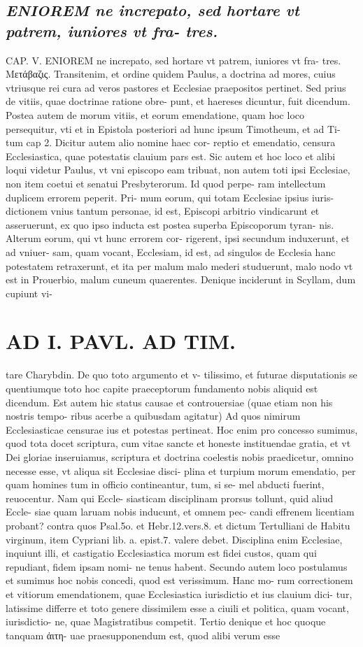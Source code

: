 \documentclass{article}
\begin{document}
\begin{pages}
\subsection*{\textit{ENIOREM ne increpato, sed hortare vt patrem, iuniores vt fra- tres.}}CAP. V. ENIOREM ne increpato, sed hortare vt patrem, iuniores vt fra- tres. Μετάβαζις. Transitenim, et ordine quidem Paulus, a doctrina ad mores, cuius vtriusque rei cura ad veros pastores et Ecclesiae praepositos pertinet. Sed prius de vitiis, quae doctrinae ratione obre- punt, et haereses dicuntur, fuit dicendum. Postea autem de morum vitiis, et eorum emendatione, quam hoc loco persequitur, vti et in Epistola posteriori ad hunc ipsum Timotheum, et ad Ti- tum cap 2. Dicitur autem alio nomine haec cor- reptio et emendatio, censura Ecclesiastica, quae potestatis clauium pars est. Sic autem et hoc loco et alibi loqui videtur Paulus, vt vni episcopo eam tribuat, non autem toti ipsi Ecclesiae, non item coetui et senatui Presbyterorum. Id quod perpe- ram intellectum duplicem errorem peperit. Pri- mum eorum, qui totam Ecclesiae ipsius iuris- dictionem vnius tantum personae, id est, Episcopi arbitrio vindicarunt et asseruerunt, ex quo ipso inducta est postea superba Episcoporum tyran- nis. Alterum eorum, qui vt hunc errorem cor- rigerent, ipsi secundum induxerunt, et ad vniuer- sam, quam vocant, Ecclesiam, id est, ad singulos de Ecclesia hanc potestatem retraxerunt, et ita per malum malo mederi studuerunt, malo nodo vt est in Prouerbio, malum cuneum quaerentes. Denique inciderunt in Scyllam, dum cupiunt vi-  \pend
\section*{AD I. PAVL. AD TIM. }
\marginpar{[ p.240 ]}\pstart tare Charybdin. De quo toto argumento et v- tilissimo, et futurae disputationis se quentiumque toto hoc capite praeceptorum fundamento nobis aliquid est dicendum. Est autem hic status causae et controuersiae (quae etiam non his nostris tempo- ribus acerbe a quibusdam agitatur) Ad quos nimirum Ecclesiasticae censurae ius et potestas pertineat. Hoc enim pro concesso sumimus, quod tota docet scriptura, cum vitae sancte et honeste instituendae gratia, et vt Dei gloriae inseruiamus, scriptura et doctrina coelestis nobis praedicetur, omnino necesse esse, vt aliqua sit Ecclesiae disci- plina et turpium morum emendatio, per quam homines tum in officio contineantur, tum, si se- mel abducti fuerint, reuocentur. Nam qui Eccle- siasticam disciplinam prorsus tollunt, quid aliud Eccle- siae quam laruam nobis inducunt, et omnem pec- candi effrenem licentiam probant? contra quos Psal.5o. et Hebr.12.vers.8. et dictum Tertulliani de Habitu virginum, item Cypriani lib.  a. epist.7. valere debet. Disciplina enim Ecclesiae, inquiunt illi, et castigatio Ecclesiastica morum est fidei custos, quam qui repudiant, fidem ipsam nomi- ne tenus habent. Secundo autem loco postulamus et sumimus hoc nobis concedi, quod est verissimum. Hanc mo- rum correctionem et vitiorum emendationem, quae Ecclesiastica iurisdictio et ius clauium dici- tur, latissime differre et toto genere dissimilem esse a ciuili et politica, quam vocant, iurisdictio- ne, quae Magistratibus competit. Tertio denique et hoc quoque tanquam ἀιτη- uae praesupponendum est, quod alibi verum esse  \pend

\end{pages}
\end{document}

